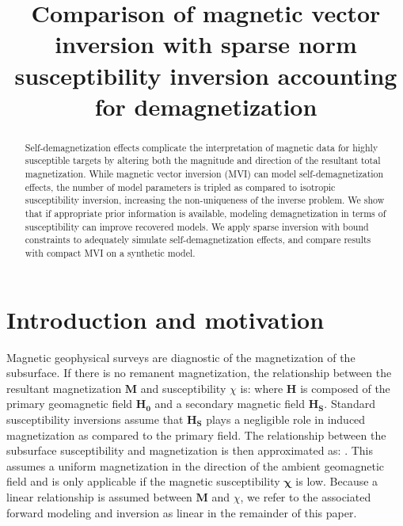 \documentclass{segabs}
\begin{document}
\title{Comparison of magnetic vector inversion with sparse norm susceptibility inversion accounting for demagnetization}



\maketitle

\begin{abstract}
\vspace{-0.6cm}

Self-demagnetization effects complicate the interpretation of magnetic data for highly susceptible targets by altering both the magnitude and direction of the resultant total magnetization. While magnetic vector inversion (MVI) can model self-demagnetization effects, the number of model parameters is tripled as compared to isotropic susceptibility inversion, increasing the non-uniqueness of the inverse problem. We show that if appropriate prior information is available, modeling demagnetization in terms of susceptibility can improve recovered models.  We apply sparse inversion with bound constraints to adequately simulate self-demagnetization effects, and compare results with compact MVI on a synthetic model.

\end{abstract}

\vspace{-0.45cm}
\section{Introduction and motivation}
\vspace{-0.25cm}

Magnetic geophysical surveys are diagnostic of the magnetization of the subsurface. If there is no remanent magnetization, the relationship between the resultant magnetization $\mathbf{M}$ and susceptibility $\chi$ is: where $\mathbf{H}$ is composed of the primary geomagnetic field $\mathbf{H_0}$ and a secondary magnetic field $\mathbf{H_S}$. Standard susceptibility inversions assume that $\mathbf{H_S}$ plays a negligible role in induced magnetization as compared to the primary field. The relationship between the subsurface susceptibility and magnetization is then approximated as: \citep{Li1996}. This assumes a uniform magnetization in the direction of the ambient geomagnetic field and is only applicable if the magnetic susceptibility $\mathbf{\chi}$ is low. Because a linear relationship is assumed between $\mathbf{M}$ and $\chi$, we refer to the associated forward modeling and inversion as linear in the remainder of this paper.
\end{document}
